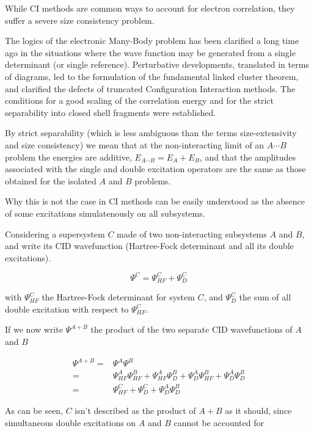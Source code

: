 \documentclass[./thesis.tex]{subfiles}
\begin{document}
While CI methods are common ways to account for electron correlation, they suffer a severe size consistency problem.


The logics of the electronic Many-Body problem has been clarified a long time
ago in the situations where  the  wave  function  may  be  generated  from  a
single  determinant  (or  single  reference).  Perturbative  developments,
translated  in  terms  of  diagrams,  led  to  the  formulation  of  the
fundamental  linked  cluster  theorem,\cite{Goldstone}  and  clarified  the  defects  of
truncated  Configuration Interaction  methods.  The  conditions  for  a  good
scaling  of  the  correlation  energy  and  for  the  strict separability  into
closed  shell  fragments  were  established.

By  strict  separability  (which
is  less ambiguous than the terms size-extensivity and size consistency) we
mean that at the non-interacting limit of an $A\cdots B$ problem the energies are
additive, $E_{A\cdots B} = E_A+E_B$, and that the amplitudes associated with the single
and  double excitation operators  are  the  same  as  those  obtained  for  the  isolated  $A$
and  $B$  problems.

Why this is not the case in CI methods can be easily understood as the absence of some excitations simulatenously on all subsystems.

Considering a supersystem $C$ made of two non-interacting subsystems $A$ and $B$, and write its CID wavefunction (Hartree-Fock determinant and all its double excitations).

\begin{equation}
\Psi^C = \Psi_{HF}^C + \Psi_{D}^C
\end{equation}

with $\Psi_{HF}^C$ the Hartree-Fock determinant for system $C$, and $\Psi_{D}^C$ the sum of all double excitation with respect to $\Psi_{HF}^C$.

If we now write $\Psi^{A+B}$ the product of the two separate CID wavefunctions of $A$ and $B$


\begin{align}
\Psi^{A+B} = & \Psi^A  \Psi^B \\
 = & \Psi_{HF}^A\Psi_{HF}^B  + \Psi_{HF}^A\Psi_{D}^B + \Psi_{D}^A\Psi_{HF}^B + \Psi_{D}^A \Psi_{D}^B \\
 = & \Psi^C_{HF} + \Psi^C_D + \Psi_{D}^A \Psi_{D}^B
\end{align}

As can be seen, $C$ isn't described as the product of $A+B$ as it should, since simultaneous double excitations on $A$ and $B$ cannot be accounted for
\end{document}
